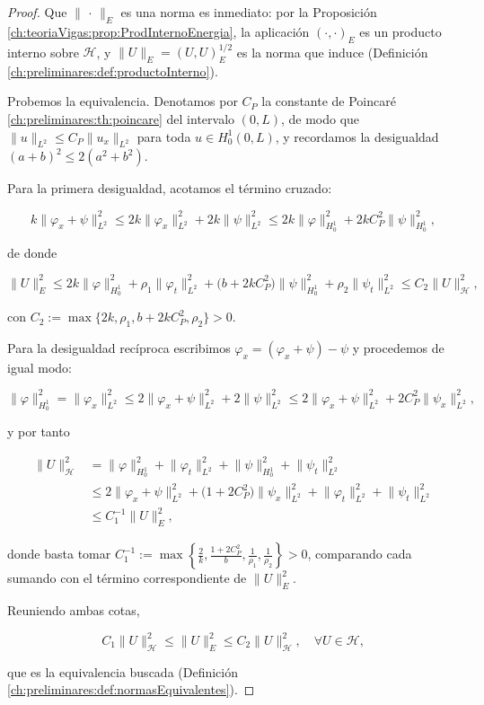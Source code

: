 \begin{proof}
    Que $\lVert \, \cdot \, \rVert_E$ es una norma es inmediato: por la Proposición \ref{ch:teoriaVigas:prop:ProdInternoEnergia}, la aplicación $(\cdot,\cdot)_E$ es un producto interno sobre $\mathcal{H}$, y $\lVert U \rVert_E = (U,U)_E^{1/2}$ es la norma que induce (Definición \ref{ch:preliminares:def:productoInterno}).

    Probemos la equivalencia. Denotamos por $C_P$ la constante de Poincaré \ref{ch:preliminares:th:poincare} del intervalo $(0,L)$, de modo que $\lVert u \rVert_{L^2} \leq C_P \lVert u_x \rVert_{L^2}$ para toda $u \in H_0^1(0,L)$, y recordamos la desigualdad $(a+b)^2 \leq 2(a^2+b^2)$.

    Para la primera desigualdad, acotamos el término cruzado:

    \[k\lVert \varphi_x + \psi \rVert^2_{L^2} \leq 2k \lVert \varphi_x \rVert^2_{L^2} + 2k\lVert \psi \rVert^2_{L^2} \leq 2k \lVert \varphi \rVert^2_{H_0^1} + 2kC_P^2 \lVert \psi \rVert^2_{H_0^1},\]

    de donde

    \[\lVert U \rVert_E^2 \leq 2k \lVert \varphi \rVert^2_{H_0^1} + \rho_1 \lVert \varphi_t \rVert^2_{L^2} + \big(b + 2kC_P^2\big) \lVert \psi \rVert^2_{H_0^1} + \rho_2 \lVert \psi_t \rVert^2_{L^2} \leq C_2 \lVert U \rVert^2_{\mathcal{H}},\]

    con $C_2 := \max\{2k, \rho_1, b + 2kC_P^2, \rho_2\} > 0$.

    Para la desigualdad recíproca escribimos $\varphi_x = (\varphi_x + \psi) - \psi$ y procedemos de igual modo:

    \[\lVert \varphi \rVert^2_{H_0^1} = \lVert \varphi_x \rVert^2_{L^2} \leq 2\lVert \varphi_x + \psi \rVert^2_{L^2} + 2\lVert \psi \rVert^2_{L^2} \leq 2\lVert \varphi_x + \psi \rVert^2_{L^2} + 2C_P^2 \lVert \psi_x \rVert^2_{L^2},\]

    y por tanto

    \begin{align*}
        \lVert U \rVert^2_{\mathcal{H}} &= \lVert \varphi \rVert^2_{H_0^1} + \lVert \varphi_t \rVert^2_{L^2} + \lVert \psi \rVert^2_{H_0^1} + \lVert \psi_t \rVert^2_{L^2}\\
        &\leq 2\lVert \varphi_x + \psi \rVert^2_{L^2} + \big(1 + 2C_P^2\big)\lVert \psi_x \rVert^2_{L^2} + \lVert \varphi_t \rVert^2_{L^2} + \lVert \psi_t \rVert^2_{L^2}\\
        &\leq C_1^{-1} \lVert U \rVert^2_E,
    \end{align*}

    donde basta tomar $C_1^{-1} := \max\left\{\tfrac{2}{k}, \tfrac{1 + 2C_P^2}{b}, \tfrac{1}{\rho_1}, \tfrac{1}{\rho_2}\right\} > 0$, comparando cada sumando con el término correspondiente de $\lVert U \rVert_E^2$.

    Reuniendo ambas cotas,

    \[C_1 \lVert U \rVert^2_{\mathcal{H}} \leq \lVert U \rVert^2_E \leq C_2 \lVert U \rVert^2_{\mathcal{H}}, \quad \forall U \in \mathcal{H},\]

    que es la equivalencia buscada (Definición \ref{ch:preliminares:def:normasEquivalentes}).
\end{proof}

